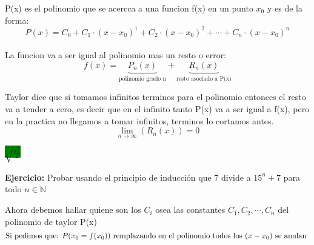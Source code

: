 
P(x) es el polinomio que se acercca a una funcion f(x) en un punto $ x_{0}$ y es de la forma: 
\[
 P(x) = C_{0} + C_{1} \cdot (x - x_{0})^{1}+C_{2} \cdot (x - x_{0})^{2} + \cdots + C_{n} \cdot (x - x_{0})^{n}
\]
\\
 La funcion va a ser igual al polinomio mas un resto o error:
\[
	f(x)=\underbrace{ P_{n}(x)}_{\text{polinomio grado n}}+ \underbrace{ R_{n}(x) }_{\text{resto asociado a P(x)}}
\]

Taylor dice que si tomamos infinitos terminos para el polinomio entonces el resto va a tender a cero, es decir que en el infinito tanto P(x) va a ser igual a f(x), pero en la practica no llegamos a tomar infinitos, terminos lo cortamos antes.
\[  \lim_{n \to \infty}(R_{n}(x))=0  \]

\colorbox{green}{$\sqrt{\frac{x^2}{2}}$}

\begin{shaded}
\textbf{Ejercicio: }
Probar usando el principio de inducción que 7 divide a $ 15^{n} + 7$ para todo $n \in \mathbb N $  
\end{shaded}

Ahora debemos hallar quiene son los $C_{i}$ osea las constantes $ C_{1}, C_{2}, \cdots , C_{n} $ del polinomio de taylor P(x)
\begin{equation}
\text{Si pedimos que: } \\
P(x_{0}=f(x_{0})) \ \text{remplazando en el polinomio todos los } (x - x_{0}) \text{ se anulan }
\end{equation}

